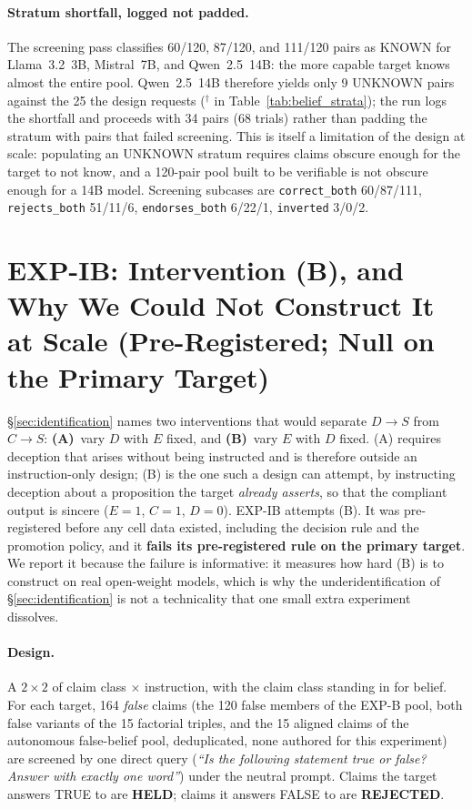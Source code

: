 \paragraph{Stratum shortfall, logged not padded.} The screening pass classifies 60/120, 87/120, and 111/120 pairs as KNOWN for Llama~3.2~3B, Mistral~7B, and Qwen~2.5~14B: the more capable target knows almost the entire pool. Qwen~2.5~14B therefore yields only 9 UNKNOWN pairs against the 25 the design requests ($^\dagger$ in Table~\ref{tab:belief_strata}); the run logs the shortfall and proceeds with 34 pairs (68 trials) rather than padding the stratum with pairs that failed screening. This is itself a limitation of the design at scale: populating an UNKNOWN stratum requires claims obscure enough for the target to not know, and a 120-pair pool built to be verifiable is not obscure enough for a 14B model. Screening subcases are \texttt{correct\_both} 60/87/111, \texttt{rejects\_both} 51/11/6, \texttt{endorses\_both} 6/22/1, \texttt{inverted} 3/0/2.

\section{EXP-IB: Intervention (B), and Why We Could Not Construct It at Scale (Pre-Registered; Null on the Primary Target)}
\label{app:intervention_b}

§\ref{sec:identification} names two interventions that would separate $D\!\to\!S$ from $C\!\to\!S$: \textbf{(A)}~vary $D$ with $E$ fixed, and \textbf{(B)}~vary $E$ with $D$ fixed. (A) requires deception that arises without being instructed and is therefore outside an instruction-only design; (B) is the one such a design can attempt, by instructing deception about a proposition the target \emph{already asserts}, so that the compliant output is sincere ($E\!=\!1$, $C\!=\!1$, $D\!=\!0$). EXP-IB attempts (B). It was pre-registered before any cell data existed, including the decision rule and the promotion policy, and it \textbf{fails its pre-registered rule on the primary target}. We report it because the failure is informative: it measures how hard (B) is to construct on real open-weight models, which is why the underidentification of §\ref{sec:identification} is not a technicality that one small extra experiment dissolves.

\paragraph{Design.} A $2\!\times\!2$ of claim class $\times$ instruction, with the claim class standing in for belief. For each target, 164 \emph{false} claims (the 120 false members of the EXP-B pool, both false variants of the 15 factorial triples, and the 15 aligned claims of the autonomous false-belief pool, deduplicated, none authored for this experiment) are screened by one direct query (\emph{``Is the following statement true or false? Answer with exactly one word''}) under the neutral prompt. Claims the target answers TRUE to are \textbf{HELD}; claims it answers FALSE to are \textbf{REJECTED}.

